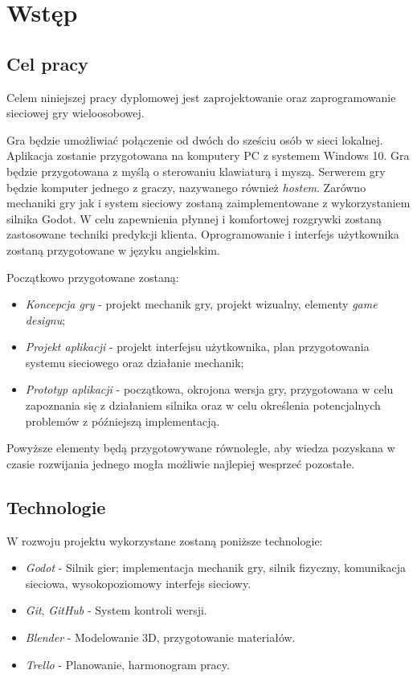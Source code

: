 \chapter*{Wstęp}
\section*{Cel pracy}

Celem niniejszej pracy dyplomowej jest zaprojektowanie oraz zaprogramowanie sieciowej gry wieloosobowej.

Gra będzie umożliwiać połączenie od dwóch do sześciu osób w sieci lokalnej. Aplikacja zostanie przygotowana na komputery PC z systemem Windows 10. Gra będzie przygotowana z myślą o sterowaniu klawiaturą i myszą.
Serwerem gry będzie komputer jednego z graczy, nazywanego również \emph{hostem}.
Zarówno mechaniki gry jak i system sieciowy zostaną zaimplementowane z wykorzystaniem silnika Godot. \cite{godot_main}
W celu zapewnienia płynnej i komfortowej rozgrywki zostaną zastosowane techniki predykcji klienta.
Oprogramowanie i interfejs użytkownika zostaną przygotowane w języku angielskim.

Początkowo przygotowane zostaną:
\begin{itemize}
    \item \emph{Koncepcja gry} - projekt mechanik gry, projekt wizualny, elementy \emph{game designu};
    \item \emph{Projekt aplikacji} - projekt interfejsu użytkownika, plan przygotowania systemu sieciowego oraz działanie mechanik;
    \item \emph{Prototyp aplikacji} - początkowa, okrojona wersja gry, przygotowana w celu zapoznania się z działaniem silnika oraz w celu określenia potencjalnych problemów z późniejszą implementacją. 
\end{itemize}

Powyższe elementy będą przygotowywane równolegle, aby wiedza pozyskana w czasie rozwijania jednego mogła możliwie najlepiej wesprzeć pozostałe.

\section*{Technologie}
W rozwoju projektu wykorzystane zostaną poniższe technologie:
\begin{itemize}
    \item \emph{Godot} - Silnik gier; implementacja mechanik gry, silnik fizyczny, komunikacja sieciowa, wysokopoziomowy interfejs sieciowy.
    \item \emph{Git}, \emph{GitHub} - System kontroli wersji.
    \item \emph{Blender} - Modelowanie 3D, przygotowanie materiałów.
    \item \emph{Trello} - Planowanie, harmonogram pracy.
\end{itemize}

